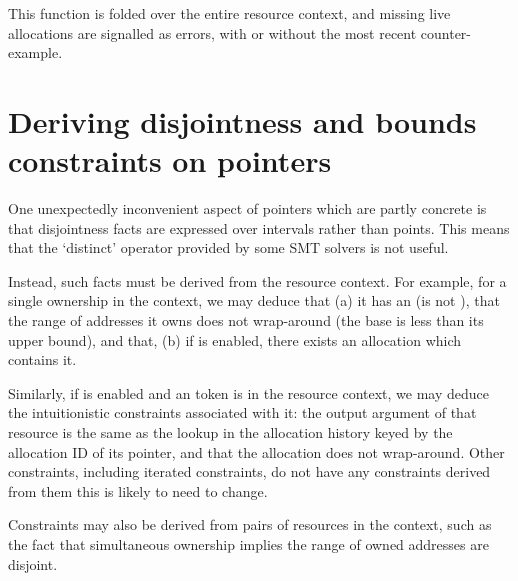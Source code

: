 
This function is folded over the entire resource context, and missing live
allocations are signalled as errors, with or without the most recent
counter-example.


\section{Deriving disjointness and bounds constraints on pointers}

One unexpectedly inconvenient aspect of pointers which are partly concrete is
that disjointness facts are expressed over intervals rather than points. This
means that the `distinct' operator provided by some SMT solvers is not
useful.

Instead, such facts must be derived from the resource context. For
example, for a single ownership in the context, we may deduce that (a) it has
an  (is not ), that the range of addresses it
owns does not wrap-around (the base is less than its upper bound), and that, (b) if
 is enabled, there exists an allocation which contains it.


Similarly, if  is enabled and an  token is in the
resource context, we may deduce the intuitionistic constraints associated with
it: the output argument of that resource is the same as the lookup in the
 allocation history keyed by the allocation ID of its pointer,
and that the allocation does not wrap-around. Other constraints, including iterated
constraints, do not have any constraints derived from them \textemdash{} this is
likely to need to
change.


Constraints may also be derived from pairs of resources in the context, such as
the fact that simultaneous ownership implies the range of owned addresses are
disjoint.


